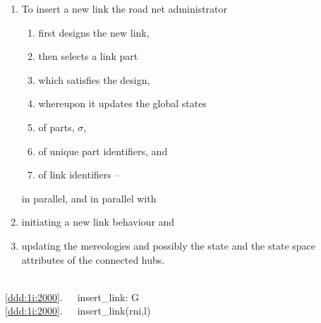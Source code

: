{\mnewfoil
\begin{enumerate}\setei
\item \label{ddd:1i:2000} To insert a new link the road net
  administrator 
\begin{enumerate}
\item \label{ddd:1i:2002}  first designs the new link,
\item \label{ddd:1i:2004}  then selects a link part 
\item \label{ddd:1i:2006}  which satisfies the design,
\item[] whereupon it updates the global states
\item \label{ddd:1i:2010} of parts, $\sigma$,
\item \label{ddd:1i:2020} of unique part identifiers, and
\item \label{ddd:1i:2030} of link identifiers --
\end{enumerate} in parallel, and in parallel with
\item \label{ddd:1i:2040} initiating a new link behaviour and
\item \label{ddd:1i:2050} updating the mereologies and possibly the
                          state and the state space attributes of the
                          connected hubs.  
\savei\end{enumerate}
\mnewfoil
\bp
{}\\
\ref{ddd:1i:2000}.\ \ \ insert\_link: G {\RIGHTARROW} \\
\ref{ddd:1i:2000}.\ \ \ insert\_link(rni,l) {\IS} \\
}
